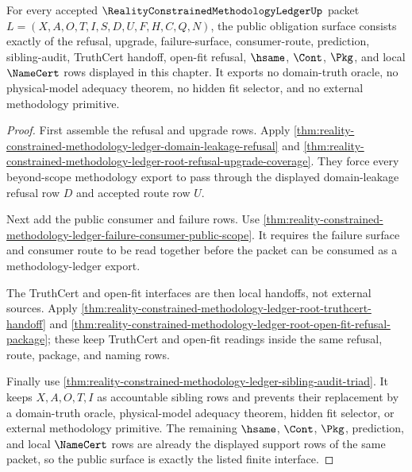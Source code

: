 \begin{theorem}
\label{thm:reality-constrained-methodology-ledger-public-obligation-surface}
For every accepted $\RealityConstrainedMethodologyLedgerUp$ packet $L=(X,A,O,T,I,S,D,U,F,H,C,Q,N)$, the public obligation surface consists exactly of the refusal, upgrade, failure-surface, consumer-route, prediction, sibling-audit, TruthCert handoff, open-fit refusal, $\hsame$, $\Cont$, $\Pkg$, and local $\NameCert$ rows displayed in this chapter. It exports no domain-truth oracle, no physical-model adequacy theorem, no hidden fit selector, and no external methodology primitive.
\end{theorem}
\begin{proof}
First assemble the refusal and upgrade rows. Apply \autoref{thm:reality-constrained-methodology-ledger-domain-leakage-refusal} and \autoref{thm:reality-constrained-methodology-ledger-root-refusal-upgrade-coverage}. They force every beyond-scope methodology export to pass through the displayed domain-leakage refusal row $D$ and accepted route row $U$.

Next add the public consumer and failure rows. Use \autoref{thm:reality-constrained-methodology-ledger-failure-consumer-public-scope}. It requires the failure surface and consumer route to be read together before the packet can be consumed as a methodology-ledger export.

The TruthCert and open-fit interfaces are then local handoffs, not external sources. Apply \autoref{thm:reality-constrained-methodology-ledger-root-truthcert-handoff} and \autoref{thm:reality-constrained-methodology-ledger-root-open-fit-refusal-package}; these keep TruthCert and open-fit readings inside the same refusal, route, package, and naming rows.

Finally use \autoref{thm:reality-constrained-methodology-ledger-sibling-audit-triad}. It keeps $X,A,O,T,I$ as accountable sibling rows and prevents their replacement by a domain-truth oracle, physical-model adequacy theorem, hidden fit selector, or external methodology primitive. The remaining $\hsame$, $\Cont$, $\Pkg$, prediction, and local $\NameCert$ rows are already the displayed support rows of the same packet, so the public surface is exactly the listed finite interface.
\end{proof}

